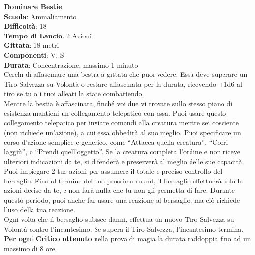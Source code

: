 \begin{multicols}{2}
\medskip\textbf{Dominare Bestie}\\
\textbf{Scuola}: Ammaliamento\\
\textbf{Difficoltà}:  18\\
\textbf{Tempo di Lancio}: 2 Azioni\\
\textbf{Gittata}: 18 metri\\
\textbf{Componenti}: V, S\\
\textbf{Durata}: Concentrazione, massimo 1 minuto\\
Cerchi di affascinare una bestia a gittata che puoi vedere. Essa deve superare un Tiro Salvezza su Volontà o restare affascinata per la durata, ricevendo +1d6 al tiro se tu o i tuoi alleati la state combattendo.\\
Mentre la bestia è affascinata, finché voi due vi trovate sullo stesso piano di esistenza mantieni un collegamento telepatico con essa. Puoi usare questo collegamento telepatico per inviare comandi alla creatura mentre sei cosciente (non richiede un'azione),
a cui essa obbedirà al suo meglio. Puoi specificare un corso d’azione semplice e generico, come “Attacca quella creatura”, “Corri laggiù”, o “Prendi quell'oggetto”. Se la creatura completa l’ordine e non riceve ulteriori indicazioni da te, si difenderà e preserverà al meglio delle sue capacità.\\
Puoi impiegare 2 tue azioni per assumere il totale e preciso controllo del bersaglio. Fino al termine del tuo prossimo round, il bersaglio effettuerà solo le azioni decise da te, e non farà nulla che tu non gli permetta di fare. Durante questo periodo, puoi anche far usare una reazione al bersaglio, ma ciò richiede l’uso della tua reazione.\\
Ogni volta che il bersaglio subisce danni, effettua un nuovo Tiro Salvezza su Volontà contro l'incantesimo. Se supera il Tiro Salvezza, l'incantesimo termina.\\
\textbf{Per ogni Critico ottenuto} nella prova di magia la durata raddoppia fino ad un massimo di 8 ore.


\end{multicols}

